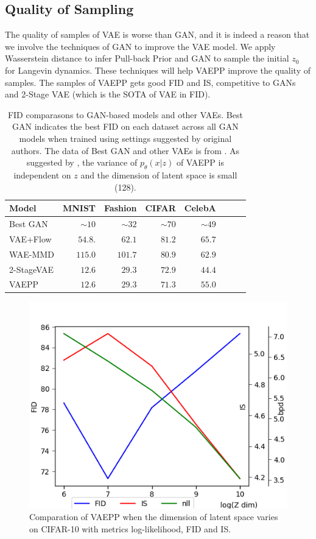 \subsection{Quality of Sampling}
The quality of samples of VAE is worse than GAN, and it is indeed a reason that we involve the techniques of GAN to improve the VAE model. We apply Wasserstein distance to infer Pull-back Prior and GAN to sample the initial $z_0$ for Langevin dynamics. These techniques will help VAEPP improve the quality of samples. The samples of VAEPP gets good FID and IS, competitive to GANs and 2-Stage VAE (which is the SOTA of VAE in FID). 
\begin{table}[tb]
\centering
\begin{tabular}{lrrrrrrr}  
\toprule
Model & MNIST & Fashion & CIFAR & CelebA\\
\midrule
Best GAN   & $\sim10$& $\sim32$&$\sim70$& $\sim49$\\
VAE+Flow   & $54.8$. & $62.1$  & $81.2$ & $65.7$\\
WAE-MMD    & $115.0$ & $101.7$ & $80.9$ & $62.9$\\
2-StageVAE & $12.6$  & $29.3$  & $72.9$ & $44.4$\\
VAEPP      & $12.6$  & $29.3$  & $71.3$ & $55.0$ \\
\bottomrule
\end{tabular}
\caption{FID comparasons to GAN-based models and other VAEs. Best GAN indicates the best FID on each dataset across all GAN models when trained using settings suggested by original authors. The data of Best GAN and other VAEs is from \protect\cite{dai2019diagnosing}. As suggested by \protect\cite{dai2019diagnosing}, the variance of $p_\theta(x|z)$ of VAEPP is independent on $z$ and the dimension of latent space is small (128). }
\label{tab:compare_FID}
\end{table}
\begin{figure}
	\centering
	\includegraphics[width=0.5\columnwidth]{../figures/fid_is_nll_on_different_dim.png}
	\caption{
	Comparation of VAEPP when the dimension of latent space varies on CIFAR-10 with metrics log-likelihood, FID and IS.
	}
	\label{fig:compare_nD_over_z_dim}
\end{figure}

